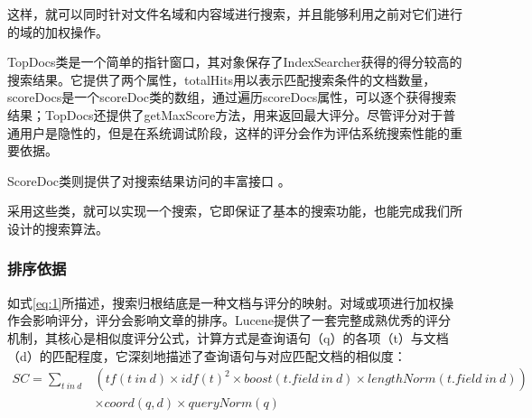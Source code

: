 \documentclass[12pt,a4paper]{article}
\begin{document}
	这样，就可以同时针对文件名域和内容域进行搜索，并且能够利用之前对它们进行的域的加权操作。
	
	\vspace{6pt}
	
	{\Times TopDocs}类是一个简单的指针窗口，其对象保存了{\Times IndexSearcher}获得的得分较高的搜索结果。它提供了两个属性，{\Times totalHits}用以表示匹配搜索条件的文档数量，{\Times scoreDocs}是一个{\Times scoreDoc}类的数组，通过遍历{\Times scoreDocs}属性，可以逐个获得搜索结果；{\Times TopDocs}还提供了{\Times getMaxScore}方法，用来返回最大评分。尽管评分对于普通用户是隐性的，但是在系统调试阶段，这样的评分会作为评估系统搜索性能的重要依据。
	\vspace{6pt}
	
	{\Times ScoreDoc}类则提供了对搜索结果访问的丰富接口
	\vspace{6pt}。
	
	采用这些类，就可以实现一个搜索，它即保证了基本的搜索功能，也能完成我们所设计的搜索算法。
	
		\subsubsection{排序依据}
	
	如式\ref{eq:1}所描述，搜索归根结底是一种文档与评分的映射。对域或项进行加权操作会影响评分，评分会影响文章的排序。{\Times Lucene}提供了一套完整成熟优秀的评分机制，其核心是相似度评分公式，计算方式是查询语句（{\Times q}）的各项（{\Times t}）与文档（{\Times d}）的匹配程度，它深刻地描述了查询语句与对应匹配文档的相似度：
	\begin{equation}\label{eq:luceneScore}
	\begin{aligned}
SC = \sum_{t\ in\ d}&(tf(t\ in\ d)\times idf(t)^2 \times boost(t.field\ in\ d) \times lengthNorm(t.field\ in\ d)) \\
   				    & \times coord(q,d) \times queryNorm(q)
    \end{aligned}
	\end{equation}
	
\end{document}
